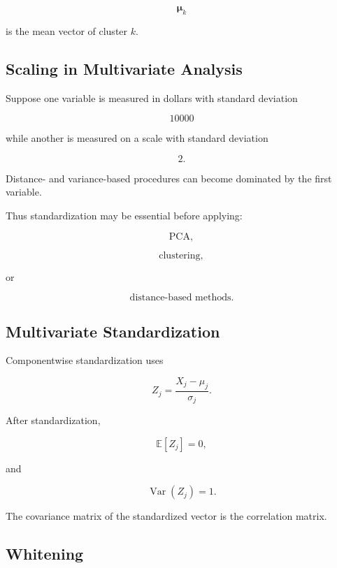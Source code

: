 \[
\boldsymbol{\mu}_k
\]

is the mean vector of cluster \(k\).

\subsection{Scaling in Multivariate Analysis}
\label{subsec:multivariate-scaling}

Suppose one variable is measured in dollars with standard deviation

\[
10000
\]

while another is measured on a scale with standard deviation

\[
2.
\]

Distance- and variance-based procedures can become dominated by the
first variable.

Thus standardization may be essential before applying:

\[
\boxed{
\text{PCA},
}
\]

\[
\boxed{
\text{clustering},
}
\]

or

\[
\boxed{
\text{distance-based methods}.
}
\]

\subsection{Multivariate Standardization}
\label{subsec:multivariate-standardization}

Componentwise standardization uses

\[
\boxed{
Z_j
=
\frac{
X_j-\mu_j
}{
\sigma_j
}.
}
\]

After standardization,

\[
\boxed{
\mathbb{E}[Z_j]=0,
}
\]

and

\[
\boxed{
\operatorname{Var}(Z_j)=1.
}
\]

The covariance matrix of the standardized vector is the correlation
matrix.

\subsection{Whitening}
\label{subsec:multivariate-whitening}

